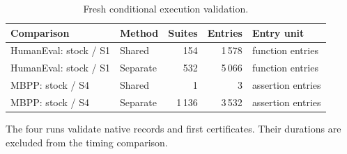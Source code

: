 \begin{table}[t]
\caption{Fresh conditional execution validation.}
\label{tab:current-native-validation}
\centering\small
\begin{tabular}{@{}llrrl@{}}
\toprule
Comparison & Method & Suites & Entries & Entry unit\\\midrule
HumanEval: stock / S1 & Shared & 154 & 1\,578 & function entries\\
HumanEval: stock / S1 & Separate & 532 & 5\,066 & function entries\\
MBPP: stock / S4 & Shared & 1 & 3 & assertion entries\\
MBPP: stock / S4 & Separate & 1\,136 & 3\,532 & assertion entries\\
\bottomrule\end{tabular}
\par\smallskip\begin{minipage}{\linewidth}\footnotesize The four runs validate native records and first certificates. Their durations are excluded from the timing comparison.\end{minipage}
\end{table}
